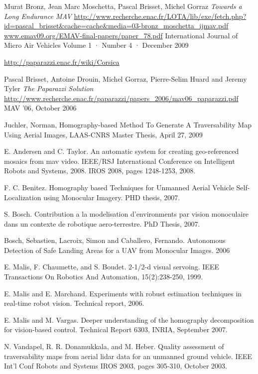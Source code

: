 \documentclass[a4paper,11pt]{report}
\begin{document}
\begin{thebibliography}{9}
  Murat Bronz, Jean Marc Moschetta, Pascal Brisset, Michel Gorraz
  \emph{Towards a Long Endurance MAV}
  \url{http://www.recherche.enac.fr/LOTA/lib/exe/fetch.php?id=pascal_brisset&cache=cache&media=03-bronz_moschetta_ijmav.pdf}
  \url{www.emav09.org/EMAV-final-papers/paper_78.pdf}
  International Journal of Micro Air Vehicles
  Volume 1 · Number 4 · December 2009

  \url{http://paparazzi.enac.fr/wiki/Corsica}

  Pascal Brisset, Antoine Drouin, Michel Gorraz, Pierre-Selim Huard and Jeremy Tyler
  \emph{The Paparazzi Solution}
  \url{http://www.recherche.enac.fr/paparazzi/papers_2006/mav06_paparazzi.pdf}
  MAV '06,
  October 2006

Juchler, Norman, Homography-based Method To Generate A Traversability Map Using Aerial Images, LAAS-CNRS Master Thesis, April 27, 2009

E. Andersen and C. Taylor. An automatic system for creating geo-referenced mosaics from mav video.  IEEE/RSJ International Conference on Intelligent Robots and Systems, 2008. IROS 2008, pages 1248-1253, 2008.

F. C. Benitez. Homography based Techniques for Unmanned Aerial Vehicle Self-Localization using Monocular Imagery. PHD thesis, 2007.

S. Bosch. Contribution a la modelisation d'environments par vision monoculaire dans un contexte de robotique aero-terrestre. PhD Thesis, 2007.

Bosch, Sebastien, Lacroix, Simon and Caballero, Fernando. Autonomous Detection of Safe Landing Areas for a UAV from Monocular Images. 2006

E. Malis, F. Chaumette, and S. Boudet. 2-1/2-d visual servoing. IEEE Transactions On Robotics And Automation, 15(2):238-250, 1999.

E. Malis and E. Marchand. Experiments with robust estimation techniques in real-time robot vision. Technical report, 2006.

E. Malis and M. Vargas. Deeper understanding of the homography decomposition for vision-based control. Technical Report 6303, INRIA, September 2007.

N. Vandapel, R. R. Donamukkala, and M. Heber. Quality assessment of traversability maps from aerial lidar data for an unmanned ground vehicle. IEEE Int'l Conf Robots and Systems IROS 2003, pages 305-310, October 2003.

\end{thebibliography}
\end{document}
